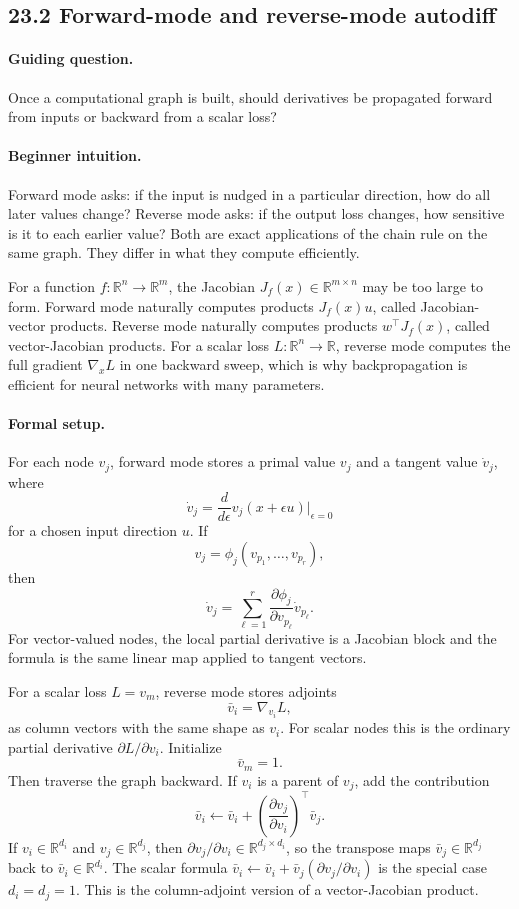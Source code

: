 \subsection{23.2 Forward-mode and reverse-mode autodiff}

\paragraph{Guiding question.}
Once a computational graph is built, should derivatives be propagated forward from inputs or backward from a scalar loss?

\paragraph{Beginner intuition.}
Forward mode asks: if the input is nudged in a particular direction, how do all later values change? Reverse mode asks: if the output loss changes, how sensitive is it to each earlier value? Both are exact applications of the chain rule on the same graph. They differ in what they compute efficiently.

For a function \(f:\mathbb{R}^n\to\mathbb{R}^m\), the Jacobian \(J_f(x)\in\mathbb{R}^{m\times n}\) may be too large to form. Forward mode naturally computes products \(J_f(x)u\), called Jacobian-vector products. Reverse mode naturally computes products \(w^\top J_f(x)\), called vector-Jacobian products. For a scalar loss \(L:\mathbb{R}^n\to\mathbb{R}\), reverse mode computes the full gradient \(\nabla_x L\) in one backward sweep, which is why backpropagation is efficient for neural networks with many parameters.

\paragraph{Formal setup.}
For each node \(v_j\), forward mode stores a primal value \(v_j\) and a tangent value \(\dot v_j\), where
\[
\dot v_j=\frac{d}{d\epsilon}v_j(x+\epsilon u)\bigg|_{\epsilon=0}
\]
for a chosen input direction \(u\). If
\[
v_j=\phi_j(v_{p_1},\ldots,v_{p_r}),
\]
then
\[
\dot v_j
=\sum_{\ell=1}^r
\frac{\partial \phi_j}{\partial v_{p_\ell}}\dot v_{p_\ell}.
\]
For vector-valued nodes, the local partial derivative is a Jacobian block and the formula is the same linear map applied to tangent vectors.

For a scalar loss \(L=v_m\), reverse mode stores adjoints
\[
\bar v_i=\nabla_{v_i} L,
\]
as column vectors with the same shape as \(v_i\). For scalar nodes this is the
ordinary partial derivative \(\partial L/\partial v_i\).
Initialize
\[
\bar v_m=1.
\]
Then traverse the graph backward. If \(v_i\) is a parent of \(v_j\), add the contribution
\[
\bar v_i \leftarrow \bar v_i+
\left(\frac{\partial v_j}{\partial v_i}\right)^\top\bar v_j.
\]
If \(v_i\in\mathbb{R}^{d_i}\) and \(v_j\in\mathbb{R}^{d_j}\), then
\(\partial v_j/\partial v_i\in\mathbb{R}^{d_j\times d_i}\), so the transpose
maps \(\bar v_j\in\mathbb{R}^{d_j}\) back to
\(\bar v_i\in\mathbb{R}^{d_i}\). The scalar formula
\(\bar v_i\leftarrow \bar v_i+\bar v_j(\partial v_j/\partial v_i)\) is the
special case \(d_i=d_j=1\). This is the column-adjoint version of a
vector-Jacobian product.

